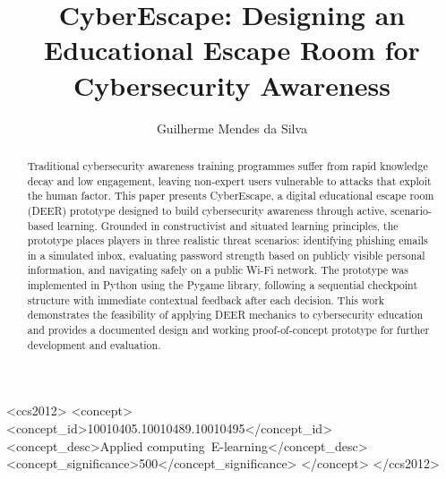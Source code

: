 \documentclass[sigconf, authorversion=true, nonacm=true]{acmart}%
\begin{document}
\title{CyberEscape: Designing an Educational Escape Room for Cybersecurity Awareness}

\author{Guilherme Mendes da Silva}


\renewcommand{\shortauthors}{Mendes}

\begin{abstract}
Traditional cybersecurity awareness training programmes suffer from rapid knowledge decay and low engagement, leaving non-expert users vulnerable to attacks that exploit the human factor. This paper presents CyberEscape, a digital educational escape room (DEER) prototype designed to build cybersecurity awareness through active, scenario-based learning. Grounded in constructivist and situated learning principles, the prototype places players in three realistic threat scenarios: identifying phishing emails in a simulated inbox, evaluating password strength based on publicly visible personal information, and navigating safely on a public Wi-Fi network. The prototype was implemented in Python using the Pygame library, following a sequential checkpoint structure with immediate contextual feedback after each decision. This work demonstrates the feasibility of applying DEER mechanics to cybersecurity education and provides a documented design and working proof-of-concept prototype for further development and evaluation.
\end{abstract}

\begin{CCSXML}
<ccs2012>
   <concept>
       <concept_id>10010405.10010489.10010495</concept_id>
       <concept_desc>Applied computing~E-learning</concept_desc>
       <concept_significance>500</concept_significance>
       </concept>
 </ccs2012>
\end{CCSXML}
\end{document}
